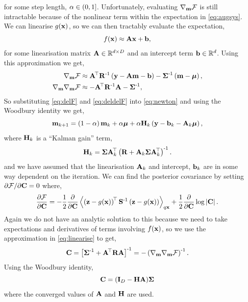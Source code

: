 \documentclass{article} %
\begin{document}
for some step length, $\step \in (0, 1]$. Unfortunately, evaluating
$\nabla_\pomean\Fengy$ is still intractable because of the nonlinear term
within the expectation in \eqref{eq:augsys}. We can linearise
$\augnonlin{\lstate}$, so we can then tractably evaluate the expectation,
\begin{equation}
    \nonlin{\lstate} \approx \Linmat\lstate + \intcpt,
    \label{eq:linearise}
\end{equation}
for some linearisation matrix $\Linmat \in \real{d \times D}$ and an intercept
term $\intcpt \in \real{d}$. Using this approximation we get,
\begin{align}
    \nabla_\pomean \Fengy
        &\approx \Linmat\transpose\lcov\inv\brac{\obs - \Linmat\pomean 
            - \intcpt} - \prcov\inv\brac{\pomean - \prmean}, 
        \label{eq:delF} \\
    \nabla_\pomean \nabla_\pomean \Fengy
        &\approx - \Linmat\transpose\lcov\inv\Linmat - \prcov\inv,
        \label{eq:deldelF}
\end{align}
So substituting \eqref{eq:delF} and \eqref{eq:deldelF} into \eqref{eq:newton}
and using the Woodbury identity we get,
\begin{equation}
    \pomean_{k+1} = \brac{1-\step}\pomean_k + \step\prmean 
        + \step\Kgain_k\brac{\obs - \intcpt_k - \Linmat_k\prmean},
    \label{eq:pomean}
\end{equation}
where $\Kgain_k$ is a ``Kalman gain'' term,
\begin{equation}
    \Kgain_k = \prcov\Linmat_k\transpose\brac{\lcov +
        \Linmat_k\prcov\Linmat_k\transpose}\inv.
    \label{eq:kgain}
\end{equation}
and we have assumed that the linearisation $\Linmat_k$ and intercept,
$\intcpt_k$ are in some way dependent on the iteration. We can find the 
posterior covariance by setting $\partial\Fengy/\partial\pocov = 0$ where,
\begin{equation}
    \frac{\partial\Fengy}{\partial\pocov} = -\frac{1}{2} 
        \frac{\partial}{\partial\pocov}
        \expec{q\lstate}{
            \brac{\augobs - \augnonlin{\lstate}}\transpose\augcov\inv
            \brac{\augobs - \augnonlin{\lstate}}
    } 
    + \frac{1}{2} \frac{\partial}{\partial\pocov} \log \deter{\pocov}.
\end{equation}
Again we do not have an analytic solution to this because we need to take
expectations and derivatives of terms involving $\nonlin{\lstate}$, so we use
the approximation in \eqref{eq:linearise} to get,
\begin{equation}
    \pocov = \sbrac{\prcov\inv + \Linmat\transpose\lcov\Linmat}\inv
    = - \brac{\nabla_\pomean \nabla_\pomean \Fengy}\inv.
\end{equation}
Using the Woodbury identity,
\begin{equation}
    \pocov = \brac{\ident{D} - \Kgain\Linmat}\!\prcov
    \label{eq:pocov}
\end{equation}
where the converged values of $\Linmat$ and $\Kgain$ are used.
\end{document}

